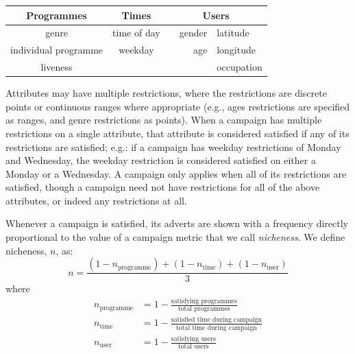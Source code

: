 	\begin{center}
		\begin{tabular}{c c r l}
			\toprule
			\textbf{Programmes} & \textbf{Times} & \multicolumn{2}{c}{\textbf{Users}} \\
			\midrule
			genre & time of day & ~~gender & latitude \\ %
			individual programme & weekday & age & longitude \\
			liveness & & &  occupation \\
			\bottomrule
		\end{tabular}
	\end{center}

	Attributes may have multiple restrictions, where the restrictions are discrete points or continuous ranges where appropriate (e.g., ages restrictions are specified as ranges, and genre restrictions as points). When a campaign has multiple restrictions on a single attribute, that attribute is considered satisfied if any of its restrictions are satisfied; e.g.: if a campaign has weekday restrictions of Monday and Wednesday, the weekday restriction is considered satisfied on either a Monday or a Wednesday. A campaign only applies when all of its restrictions are satisfied, though a campaign need not have restrictions for all of the above attributes, or indeed any restrictions at all.

	Whenever a campaign is satisfied, its adverts are shown with a frequency directly proportional to the value of a campaign metric that we call \textit{nicheness}. We define nicheness, $n$, as:
	$$
		n = \frac{(1-n_\text{programme}) + (1-n_\text{time}) + (1-n_\text{user})}{3}
	$$
	where
	\begin{align*}
		n_\text{programme} &= 1 - \frac{\text{satisfying programmes}}{\text{total programmes}} \\
		n_\text{time} &= 1 - \frac{\text{satisfied time during campaign}}{\text{total time during campaign}} \\
		n_\text{user} &= 1 - \frac{\text{satisfying users}}{\text{total users}}
	\end{align*}

